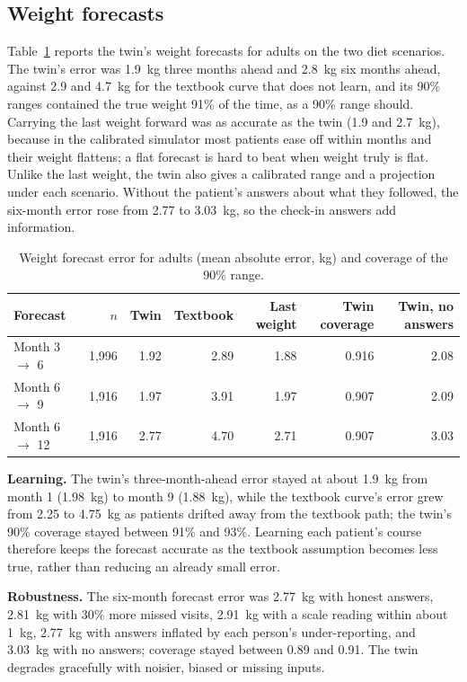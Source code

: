 \subsection{Weight forecasts}

Table~\ref{tab:r_forecasts} reports the twin's weight forecasts for adults on
the two diet scenarios. The twin's error was 1.9~kg three months ahead and
2.8~kg six months ahead, against 2.9 and 4.7~kg for the textbook curve that
does not learn, and its 90\% ranges contained the true weight 91\% of the
time, as a 90\% range should. Carrying the last weight forward was as accurate
as the twin (1.9 and 2.7~kg), because in the calibrated simulator most
patients ease off within months and their weight flattens; a flat forecast is
hard to beat when weight truly is flat. Unlike the last weight, the twin also
gives a calibrated range and a projection under each scenario. Without the
patient's answers about what they followed, the six-month error rose from 2.77
to 3.03~kg, so the check-in answers add information.

\begin{table}[htbp]
\centering
\caption{Weight forecast error for adults (mean absolute error, kg) and coverage of the 90\% range.}
\label{tab:r_forecasts}
\begin{tabular}{p{2.6cm}rrrrrr}
\toprule
Forecast & $n$ & Twin & Textbook & Last weight & Twin coverage & Twin, no answers \\
\midrule
Month 3 $\to$ 6 & 1{,}996 & 1.92 & 2.89 & 1.88 & 0.916 & 2.08 \\
Month 6 $\to$ 9 & 1{,}916 & 1.97 & 3.91 & 1.97 & 0.907 & 2.09 \\
Month 6 $\to$ 12 & 1{,}916 & 2.77 & 4.70 & 2.71 & 0.907 & 3.03 \\
\bottomrule
\end{tabular}
\end{table}

\textbf{Learning.} The twin's three-month-ahead error stayed at about 1.9~kg
from month 1 (1.98~kg) to month 9 (1.88~kg), while the textbook curve's error
grew from 2.25 to 4.75~kg as patients drifted away from the textbook path; the
twin's 90\% coverage stayed between 91\% and 93\%. Learning each patient's
course therefore keeps the forecast accurate as the textbook assumption
becomes less true, rather than reducing an already small error.

\textbf{Robustness.} The six-month forecast error was 2.77~kg with honest
answers, 2.81~kg with 30\% more missed visits, 2.91~kg with a scale reading
within about 1~kg, 2.77~kg with answers inflated by each person's
under-reporting, and 3.03~kg with no answers; coverage stayed between 0.89 and
0.91. The twin degrades gracefully with noisier, biased or missing inputs.

